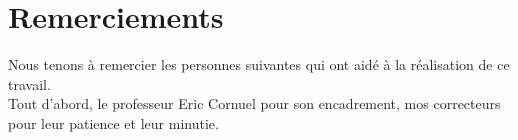 \documentclass[a4paper,11pt]{report}
\begin{document}
 
\newpage

\hfill\begin{minipage}[c]{0.65\textwidth}

\vspace{5cm}
\section*{Remerciements}
Nous tenons à remercier les personnes suivantes qui ont aidé à la réalisation de ce travail. \\ 

Tout d'abord, le professeur Eric Cornuel pour son encadrement, mos correcteurs pour leur patience et leur minutie.
\end{minipage} 
\newpage

\tableofcontents  %
 
 
 
 



\label{Bibliographie}
 



%
\end{document}

